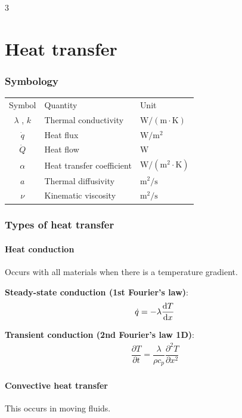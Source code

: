 \documentclass[9pt, landscape, a4paper]{article}
\begin{document}
\vspace*{-.5cm}
\setlength{\columnsep}{0.5cm}

\begin{multicols*}{3}
\raggedcolumns
\vspace*{-.7cm}
\part{Heat transfer}
\section*{Symbology}
\begin{center}
  \begin{tabular}{cll}
    Symbol & Quantity & Unit \\
    $\lambda$ , $k$ & Thermal conductivity & $\mathrm{W/(m\cdot K)}$ \\
    $\dot{q}$ & Heat flux & $\mathrm{W/m^2}$ \\
    $\dot{Q}$ & Heat flow & $\mathrm{W}$ \\
    $\alpha$ & Heat transfer coefficient & $\mathrm{W/(m^2\cdot K)}$ \\
    $a$ & Thermal diffusivity & $\mathrm{m^2/s}$ \\
    $\nu$ & Kinematic viscosity & $\mathrm{m^2/s}$
  \end{tabular}
\end{center}

\section{Types of heat transfer}
\subsection{Heat conduction}
Occurs with all materials when there is a temperature gradient.

\textbf{Steady-state conduction (1st Fourier's law)}:
\begin{gather*}
  \dot{q} = -\lambda\dfrac{{\mathrm{d}}{T}}{\mathrm{d}{x}}
\end{gather*}

\textbf{Transient conduction (2nd Fourier's law 1D)}:
\begin{gather*}
  \dfrac{\partial T}{\partial t} = \dfrac{\lambda}{\rho c_p} \dfrac{\partial^2 T}{\partial x^2}
\end{gather*}

\subsection{Convective heat transfer}
This occurs in moving fluids.


\end{multicols*}
\end{document}
